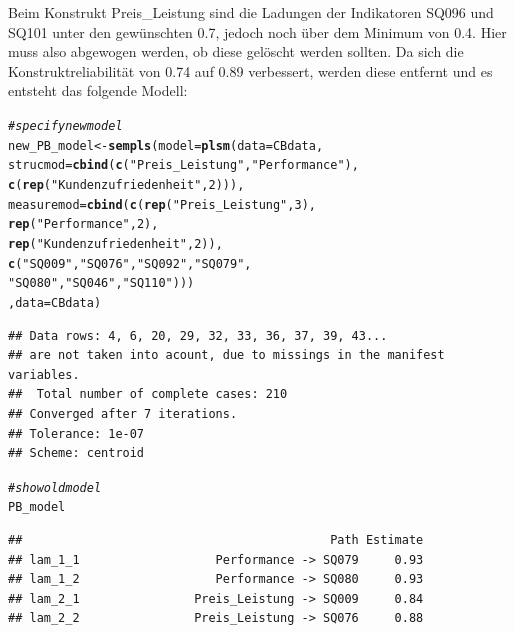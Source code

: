 \documentclass{article}\usepackage[]{graphicx}\usepackage[]{color}
\makeatletter
\newcommand{\hlnum}[1]{\textcolor[rgb]{0.686,0.059,0.569}{#1}}%
\newcommand{\hlstr}[1]{\textcolor[rgb]{0.192,0.494,0.8}{#1}}%
\newcommand{\hlcom}[1]{\textcolor[rgb]{0.678,0.584,0.686}{\textit{#1}}}%
\newcommand{\hlstd}[1]{\textcolor[rgb]{0.345,0.345,0.345}{#1}}%
\newcommand{\hlkwb}[1]{\textcolor[rgb]{0.69,0.353,0.396}{#1}}%
\newcommand{\hlkwc}[1]{\textcolor[rgb]{0.333,0.667,0.333}{#1}}%
\newcommand{\hlkwd}[1]{\textcolor[rgb]{0.737,0.353,0.396}{\textbf{#1}}}%
\newenvironment{kframe}{%
 \def\at@end@of@kframe{}%
 \ifinner\ifhmode%
  \def\at@end@of@kframe{\end{minipage}}%
  \begin{minipage}{\columnwidth}%
 \fi\fi%
 \def\FrameCommand##1{\hskip\@totalleftmargin \hskip-\fboxsep
 \colorbox{shadecolor}{##1}\hskip-\fboxsep
     \hskip-\linewidth \hskip-\@totalleftmargin \hskip\columnwidth}%
 \MakeFramed {\advance\hsize-\width
   \@totalleftmargin\z@ \linewidth\hsize
   \@setminipage}}%
 {\par\unskip\endMakeFramed%
 \at@end@of@kframe}
\newenvironment{knitrout}{}{} %
\makeatother
\begin{document}
Beim Konstrukt Preis\_Leistung sind die Ladungen der Indikatoren SQ096 und SQ101 unter den gewünschten 0.7, jedoch noch über dem Minimum von 0.4. Hier muss also abgewogen werden, ob diese gelöscht werden sollten. Da sich die Konstruktreliabilität von 0.74 auf 0.89 verbessert, werden diese entfernt und es entsteht das folgende Modell: 
\begin{knitrout}
\color{fgcolor}\begin{kframe}
\begin{alltt}
\hlcom{#specify new model}
\hlstd{new_PB_model} \hlkwb{<-} \hlkwd{sempls}\hlstd{(}\hlkwc{model} \hlstd{=} \hlkwd{plsm}\hlstd{(}\hlkwc{data} \hlstd{= CBdata,}
                \hlkwc{strucmod} \hlstd{=} \hlkwd{cbind}\hlstd{(}\hlkwd{c}\hlstd{(}\hlstr{"Preis_Leistung"}\hlstd{,}\hlstr{"Performance"}\hlstd{),}
                                 \hlkwd{c}\hlstd{(}\hlkwd{rep}\hlstd{(}\hlstr{"Kundenzufriedenheit"}\hlstd{,}\hlnum{2}\hlstd{))),}
                \hlkwc{measuremod} \hlstd{=} \hlkwd{cbind}\hlstd{(}\hlkwd{c}\hlstd{(}\hlkwd{rep}\hlstd{(}\hlstr{"Preis_Leistung"}\hlstd{,}\hlnum{3}\hlstd{),}
                                     \hlkwd{rep}\hlstd{(}\hlstr{"Performance"}\hlstd{,}\hlnum{2}\hlstd{),}
                                     \hlkwd{rep}\hlstd{(}\hlstr{"Kundenzufriedenheit"}\hlstd{,}\hlnum{2}\hlstd{)),}
                                   \hlkwd{c}\hlstd{(}\hlstr{"SQ009"}\hlstd{,}\hlstr{"SQ076"}\hlstd{,}\hlstr{"SQ092"}\hlstd{,}\hlstr{"SQ079"}\hlstd{,}
                                     \hlstr{"SQ080"}\hlstd{,}\hlstr{"SQ046"}\hlstd{,}\hlstr{"SQ110"}\hlstd{)))}
                \hlstd{,}\hlkwc{data} \hlstd{= CBdata)}
\end{alltt}
\begin{verbatim}
## Data rows: 4, 6, 20, 29, 32, 33, 36, 37, 39, 43...
## are not taken into acount, due to missings in the manifest variables.
##  Total number of complete cases: 210 
## Converged after 7 iterations.
## Tolerance: 1e-07
## Scheme: centroid
\end{verbatim}
\begin{alltt}
\hlcom{#show old model}
\hlstd{PB_model}
\end{alltt}
\begin{verbatim}
##                                           Path Estimate
## lam_1_1                   Performance -> SQ079     0.93
## lam_1_2                   Performance -> SQ080     0.93
## lam_2_1                Preis_Leistung -> SQ009     0.84
## lam_2_2                Preis_Leistung -> SQ076     0.88

\end{verbatim}
\end{kframe}
\end{knitrout}
\end{document}
